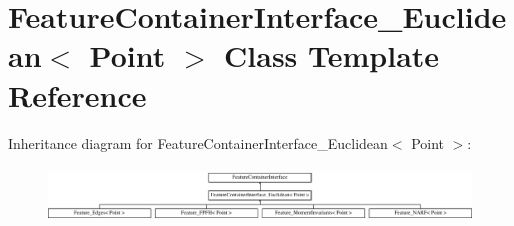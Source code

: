 \hypertarget{classFeatureContainerInterface__Euclidean}{
\section{FeatureContainerInterface\_\-Euclidean$<$ Point $>$ Class Template Reference}
\label{classFeatureContainerInterface__Euclidean}
}
Inheritance diagram for FeatureContainerInterface\_\-Euclidean$<$ Point $>$:\begin{figure}[H]
\begin{center}
\leavevmode
\includegraphics[height=1.478873cm]{classFeatureContainerInterface__Euclidean}
\end{center}
\end{figure}
